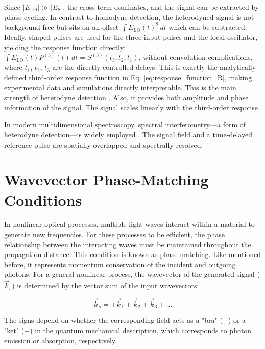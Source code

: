 \noindent Since $|E_{\text{LO}}| \gg |E_{\text{S}}|$, the cross-term dominates, and the signal can be extracted by phase-cycling. In contrast to homodyne detection, the heterodyned signal is not background-free but sits on an offset $\int E_{\text{LO}}(t)^2 \, dt$ which can be subtracted. Ideally, shaped pulses are used for the three input pulses and the local oscillator, yielding the response function directly: $\int E_{\text{LO}}(t) P^{(3)}(t) \, dt = S^{(3)}(t_3, t_2, t_1)$, without convolution complications, where $t_1$, $t_2$, $t_3$ are the directly controlled delays. This is exactly the analytically defined third-order response function in Eq. \eqref{eq:response_function_R}, making experimental data and simulations directly interpretable. This is the main strength of heterodyne detection \cite{mukamel1995principlesnonlinearoptical}. Also, it provides both amplitude and phase information of the signal. The signal scales linearly with the third-order response  

\noindent In modern multidimensional spectroscopy, spectral interferometry—a form of heterodyne detection—is widely employed \cite{hybletal1998twodimensionalelectronicspectroscopy}. The signal field and a time-delayed reference pulse are spatially overlapped and spectrally resolved.

\section{Wavevector Phase-Matching Conditions}
\label{sec:phase_matching}

\noindent 
In nonlinear optical processes, multiple light waves interact within a material to generate new frequencies. For these processes to be efficient, the phase relationship between the interacting waves must be maintained throughout the propagation distance. This condition is known as phase-matching.
\noindent 
Like mentioned before, it represents momentum conservation of the incident and outgoing photons. For a general nonlinear process, the wavevector of the generated signal ($\vec{k}_s$) is determined by the vector sum of the input wavevectors:

\begin{equation}
	\vec{k}_s = \pm\vec{k}_1 \pm\vec{k}_2 \pm\vec{k}_3 \pm \ldots
	\label{eq:phase_matching}
\end{equation}

\noindent 
The signs depend on whether the corresponding field acts as a "bra" ($-$) or a "ket" ($+$) in the quantum mechanical description, which corresponds to photon emission or absorption, respectively.

